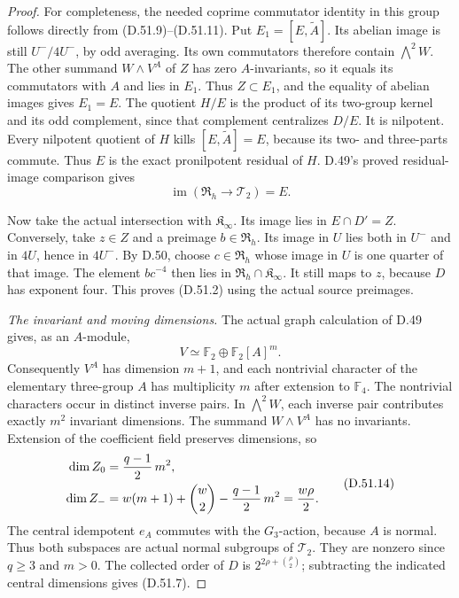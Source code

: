\begin{proof}
For completeness, the needed coprime commutator
identity in this group follows directly from
(D.51.9)--(D.51.11). Put \(E_1=[E,\widetilde A]\).
Its abelian image is still \(U^-/4U^-\), by odd
averaging. Its own commutators therefore contain
\(\bigwedge^2W\). The other summand
\(W\wedge V^A\) of \(Z\) has zero \(A\)-invariants,
so it equals its commutators with \(A\) and lies
in \(E_1\). Thus \(Z\subset E_1\), and the equality
of abelian images gives \(E_1=E\).
The quotient \(H/E\) is the product of its
two-group kernel and its odd complement, since
that complement centralizes \(D/E\). It is
nilpotent. Every nilpotent quotient of \(H\)
kills \([E,\widetilde A]=E\), because its two-
and three-parts commute. Thus \(E\) is the exact
pronilpotent residual of \(H\). D.49's proved
residual-image comparison gives
\[
              \operatorname{im}(\mathfrak R_h
                                      \to\mathcal T_2)=E .
 \tag{D.51.12}
\]

Now take the actual intersection with
\(\mathfrak K_\infty\). Its image lies in
\(E\cap D'=Z\). Conversely, take \(z\in Z\)
and a preimage \(b\in\mathfrak R_h\).
Its image in \(U\) lies both in \(U^-\) and in
\(4U\), hence in \(4U^-\). By D.50, choose
\(c\in\mathfrak R_h\) whose image in \(U\)
is one quarter of that image. The element
\(bc^{-4}\) then lies in
\(\mathfrak R_h\cap\mathfrak K_\infty\).
It still maps to \(z\), because \(D\) has
exponent four. This proves (D.51.2) using the
actual source preimages.

\emph{The invariant and moving dimensions.}
The actual graph calculation of D.49 gives, as
an \(A\)-module,
\[
              V\simeq\mathbb F_2\oplus\mathbb F_2[A]^m .
 \tag{D.51.13}
\]
Consequently \(V^A\) has dimension \(m+1\), and
each nontrivial character of the elementary
three-group \(A\) has multiplicity \(m\) after
extension to \(\mathbb F_4\). The nontrivial
characters occur in distinct inverse pairs.
In \(\bigwedge^2W\), each inverse pair contributes
exactly \(m^2\) invariant dimensions. The
summand \(W\wedge V^A\) has no invariants.
Extension of the coefficient field preserves
dimensions, so
\[
 \begin{aligned}
 \dim Z_0&={q-1\over2}\,m^2,\\
 \dim Z_-&=w(m+1)+\binom w2-{q-1\over2}\,m^2
             ={w\rho\over2}.
 \end{aligned}
 \tag{D.51.14}
\]
The central idempotent \(e_A\) commutes with
the \(G_3\)-action, because \(A\) is normal.
Thus both subspaces are actual normal subgroups
of \(\mathcal T_2\). They are nonzero since
\(q\ge3\) and \(m>0\). The collected order
of \(D\) is \(2^{2\rho+\binom\rho2}\); subtracting
the indicated central dimensions gives (D.51.7).


\end{proof}
